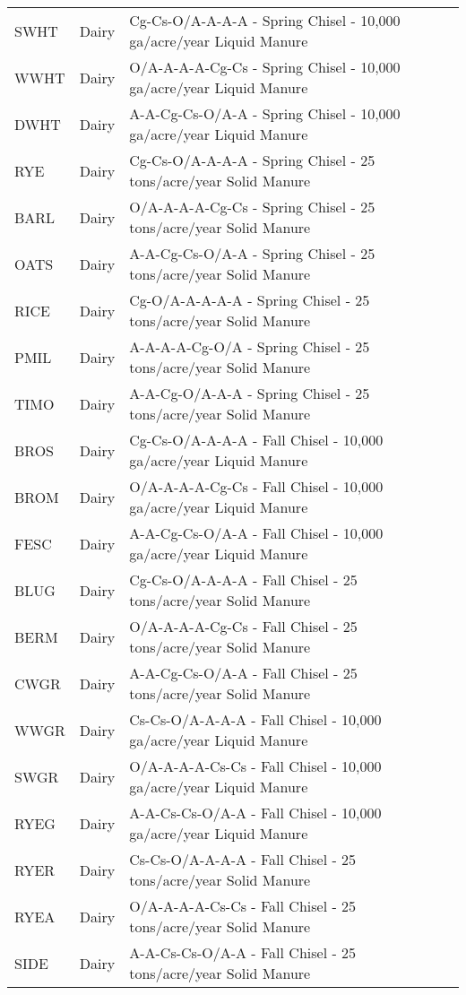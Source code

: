 \begin{landscape}
\begin{longtable}{l l l}
	\hline	\endlastfoot
  SWHT & Dairy & Cg-Cs-O/A-A-A-A - Spring Chisel - 10,000 ga/acre/year Liquid Manure \\ 
  WWHT & Dairy & O/A-A-A-A-Cg-Cs - Spring Chisel - 10,000 ga/acre/year Liquid Manure \\ 
  DWHT & Dairy & A-A-Cg-Cs-O/A-A - Spring Chisel - 10,000 ga/acre/year Liquid Manure \\ 
  RYE & Dairy & Cg-Cs-O/A-A-A-A - Spring Chisel - 25 tons/acre/year Solid Manure \\ 
  BARL & Dairy & O/A-A-A-A-Cg-Cs - Spring Chisel - 25 tons/acre/year Solid Manure \\ 
  OATS & Dairy & A-A-Cg-Cs-O/A-A - Spring Chisel - 25 tons/acre/year Solid Manure \\ 
  RICE & Dairy & Cg-O/A-A-A-A-A - Spring Chisel - 25 tons/acre/year Solid Manure \\ 
  PMIL & Dairy & A-A-A-A-Cg-O/A - Spring Chisel - 25 tons/acre/year Solid Manure \\ 
  TIMO & Dairy & A-A-Cg-O/A-A-A - Spring Chisel - 25 tons/acre/year Solid Manure \\ 
  BROS & Dairy & Cg-Cs-O/A-A-A-A - Fall Chisel - 10,000 ga/acre/year Liquid Manure \\ 
  BROM & Dairy & O/A-A-A-A-Cg-Cs - Fall Chisel - 10,000 ga/acre/year Liquid Manure \\ 
  FESC & Dairy & A-A-Cg-Cs-O/A-A - Fall Chisel - 10,000 ga/acre/year Liquid Manure \\ 
  BLUG & Dairy & Cg-Cs-O/A-A-A-A - Fall Chisel - 25 tons/acre/year Solid Manure \\ 
  BERM & Dairy & O/A-A-A-A-Cg-Cs - Fall Chisel - 25 tons/acre/year Solid Manure \\ 
  CWGR & Dairy & A-A-Cg-Cs-O/A-A - Fall Chisel - 25 tons/acre/year Solid Manure \\ 
  WWGR & Dairy & Cs-Cs-O/A-A-A-A - Fall Chisel - 10,000 ga/acre/year Liquid Manure \\ 
  SWGR & Dairy & O/A-A-A-A-Cs-Cs - Fall Chisel - 10,000 ga/acre/year Liquid Manure \\ 
  RYEG & Dairy & A-A-Cs-Cs-O/A-A - Fall Chisel - 10,000 ga/acre/year Liquid Manure \\ 
  RYER & Dairy & Cs-Cs-O/A-A-A-A - Fall Chisel - 25 tons/acre/year Solid Manure \\ 
  RYEA & Dairy & O/A-A-A-A-Cs-Cs - Fall Chisel - 25 tons/acre/year Solid Manure \\ 
  SIDE & Dairy & A-A-Cs-Cs-O/A-A - Fall Chisel - 25 tons/acre/year Solid Manure \\ 

\end{longtable}
\end{landscape}
